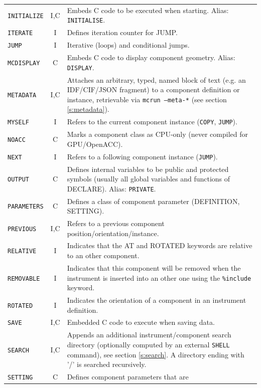 \begin{table}
\begin{center}
{\begin{tabular}{|l|c|p{}|}
      \texttt{INITIALIZE} & I,C & Embeds C code to be executed when starting. Alias: \texttt{INITIALISE}. \\
      \texttt{ITERATE} & I & Defines iteration counter for JUMP. \\
      \texttt{JUMP} & I & Iterative (loops) and conditional jumps. \\
      \texttt{MCDISPLAY} & C & Embeds C code to display component geometry. Alias: \texttt{DISPLAY}. \\
      \texttt{METADATA} & I,C & Attaches an arbitrary, typed, named block of text (e.g. an IDF/CIF/JSON fragment) to a component definition or instance, retrievable via \texttt{mcrun --meta-*} (see section \ref{s:metadata}). \\
      \texttt{MYSELF} & I & Refers to the current component instance (\texttt{COPY}, \texttt{JUMP}). \\
      \texttt{NOACC} & C & Marks a component class as CPU-only (never compiled for GPU/OpenACC). \\
      \texttt{NEXT} & I & Refers to a following component instance (\texttt{JUMP}). \\
      \texttt{OUTPUT} & C & Defines internal variables to be public and protected symbols (usually all global variables and functions of DECLARE). Alias: \texttt{PRIVATE}.\\
      \texttt{PARAMETERS} & C & Defines a class of component parameter (DEFINITION, SETTING). \\
      \texttt{PREVIOUS} & I,C & Refers to a previous component position/orientation/instance.\\
      \texttt{RELATIVE} & I & Indicates that the AT and ROTATED keywords are relative to an other component. \\
      \texttt{REMOVABLE} & I & Indicates that this component will be removed when the instrument is inserted into an other one using the \texttt{\%include} keyword. \\
      \texttt{ROTATED} & I & Indicates the orientation of a component in an instrument definition. \\
      \texttt{SAVE} & I,C & Embedded C code to execute when saving data. \\
      \texttt{SEARCH} & I,C & Appends an additional instrument/component search directory (optionally computed by an external \texttt{SHELL} command), see section \ref{s:search}. A directory ending with '/' is searched recursively. \\
      \texttt{SETTING} & C & Defines component parameters that are

\end{tabular}}
\end{center}
\end{table}
